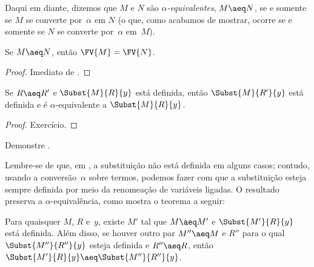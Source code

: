 \documentclass[../../../include/open-logic-section]{subfiles}
\begin{document}
Daqui em diante, dizemos que $M$ e $N$ são \emph{$\alpha$-equivalentes},
$M \aeq N$, se e somente se $M$ se converte por~$\alpha$ em $N$ (o que, como
acabamos de mostrar, ocorre se e somente se $N$ se converte por~$\alpha$
em~$M$).

\begin{thm}
  Se $M \aeq N$, então $\FV{M} = \FV{N}$.
\end{thm}

\begin{proof}
  Imediato de .
\end{proof}

\begin{lem}
  Se $R \aeq R'$ e $\Subst{M}{R}{y}$ está definida, então
  $\Subst{M}{R'}{y}$ está definida e é $\alpha$-equivalente a
  $\Subst{M}{R}{y}$.
\end{lem}

\begin{proof}
  Exercício.
\end{proof}

\begin{prob}
  Demonstre .
\end{prob}

Lembre-se de que, em , a substituição não está definida em
alguns casos; contudo, usando a conversão~$\alpha$ sobre termos, podemos fazer
com que a substituição esteja sempre definida por meio da renomeação de
variáveis ligadas. O resultado preserva a $\alpha$-equivalência, como mostra o
teorema a seguir:

\begin{thm}
  Para quaisquer $M$, $R$ e~$y$, existe $M'$ tal que $M \aeq M'$ e
  $\Subst{M'}{R}{y}$ está definida. Além disso, se houver outro par
  $M'' \aeq M$ e $R''$ para o qual $\Subst{M''}{R''}{y}$ esteja definida e
  $R'' \aeq R$, então $\Subst{M'}{R}{y} \aeq \Subst{M''}{R''}{y}$.
\end{thm}
\end{document}
